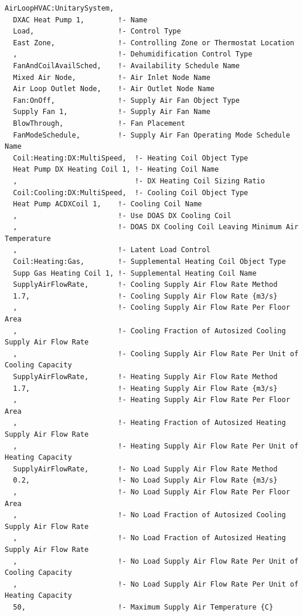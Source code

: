 \begin{lstlisting}
AirLoopHVAC:UnitarySystem,
  DXAC Heat Pump 1,        !- Name
  Load,                    !- Control Type
  East Zone,               !- Controlling Zone or Thermostat Location
  ,                        !- Dehumidification Control Type
  FanAndCoilAvailSched,    !- Availability Schedule Name
  Mixed Air Node,          !- Air Inlet Node Name
  Air Loop Outlet Node,    !- Air Outlet Node Name
  Fan:OnOff,               !- Supply Air Fan Object Type
  Supply Fan 1,            !- Supply Air Fan Name
  BlowThrough,             !- Fan Placement
  FanModeSchedule,         !- Supply Air Fan Operating Mode Schedule Name
  Coil:Heating:DX:MultiSpeed,  !- Heating Coil Object Type
  Heat Pump DX Heating Coil 1, !- Heating Coil Name
  ,                            !- DX Heating Coil Sizing Ratio
  Coil:Cooling:DX:MultiSpeed,  !- Cooling Coil Object Type
  Heat Pump ACDXCoil 1,    !- Cooling Coil Name
  ,                        !- Use DOAS DX Cooling Coil
  ,                        !- DOAS DX Cooling Coil Leaving Minimum Air Temperature
  ,                        !- Latent Load Control
  Coil:Heating:Gas,        !- Supplemental Heating Coil Object Type
  Supp Gas Heating Coil 1, !- Supplemental Heating Coil Name
  SupplyAirFlowRate,       !- Cooling Supply Air Flow Rate Method
  1.7,                     !- Cooling Supply Air Flow Rate {m3/s}
  ,                        !- Cooling Supply Air Flow Rate Per Floor Area
  ,                        !- Cooling Fraction of Autosized Cooling Supply Air Flow Rate
  ,                        !- Cooling Supply Air Flow Rate Per Unit of Cooling Capacity
  SupplyAirFlowRate,       !- Heating Supply Air Flow Rate Method
  1.7,                     !- Heating Supply Air Flow Rate {m3/s}
  ,                        !- Heating Supply Air Flow Rate Per Floor Area
  ,                        !- Heating Fraction of Autosized Heating Supply Air Flow Rate
  ,                        !- Heating Supply Air Flow Rate Per Unit of Heating Capacity
  SupplyAirFlowRate,       !- No Load Supply Air Flow Rate Method
  0.2,                     !- No Load Supply Air Flow Rate {m3/s}
  ,                        !- No Load Supply Air Flow Rate Per Floor Area
  ,                        !- No Load Fraction of Autosized Cooling Supply Air Flow Rate
  ,                        !- No Load Fraction of Autosized Heating Supply Air Flow Rate
  ,                        !- No Load Supply Air Flow Rate Per Unit of Cooling Capacity
  ,                        !- No Load Supply Air Flow Rate Per Unit of Heating Capacity
  50,                      !- Maximum Supply Air Temperature {C}

\end{lstlisting}
